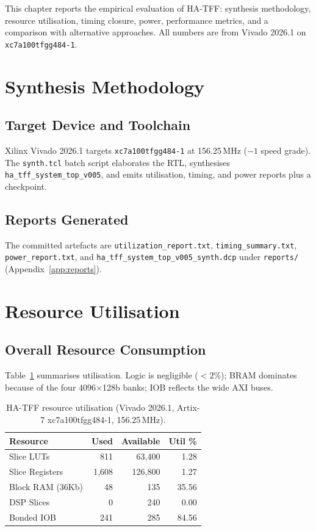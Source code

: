 \documentclass[12pt,twoside,openright]{book}
\begin{document}
This chapter reports the empirical evaluation of HA-TFF: synthesis methodology, resource
utilisation, timing closure, power, performance metrics, and a comparison with alternative
approaches. All numbers are from Vivado 2026.1 on \texttt{xc7a100tfgg484-1}.

\section{Synthesis Methodology}

\subsection{Target Device and Toolchain}

Xilinx Vivado 2026.1 targets \texttt{xc7a100tfgg484-1} at 156.25\,MHz ($-1$ speed grade). The
\texttt{synth.tcl} batch script elaborates the RTL, synthesises \texttt{ha\_tff\_system\_top\_v005},
and emits utilisation, timing, and power reports plus a checkpoint.

\subsection{Reports Generated}

The committed artefacts are \texttt{utilization\_report.txt}, \texttt{timing\_summary.txt},
\texttt{power\_report.txt}, and \texttt{ha\_tff\_system\_top\_v005\_synth.dcp} under
\texttt{reports/} (Appendix~\ref{app:reports}).

\section{Resource Utilisation}

\subsection{Overall Resource Consumption}

Table~\ref{tab:util} summarises utilisation. Logic is negligible ($<2$\%); BRAM dominates because of
the four 4096$\times$128b banks; IOB reflects the wide AXI buses.

\begin{table}[H]
\centering
\footnotesize
\begin{tabular}{lrrr}
\toprule
\textbf{Resource} & \textbf{Used} & \textbf{Available} & \textbf{Util \%} \\
\midrule
Slice LUTs & 811 & 63{,}400 & 1.28 \\
Slice Registers & 1{,}608 & 126{,}800 & 1.27 \\
Block RAM (36Kb) & 48 & 135 & 35.56 \\
DSP Slices & 0 & 240 & 0.00 \\
Bonded IOB & 241 & 285 & 84.56 \\
\bottomrule
\end{tabular}
\caption{HA-TFF resource utilisation (Vivado 2026.1, Artix-7 xc7a100tfgg484-1, 156.25\,MHz).}
\label{tab:util}
\end{table}
\end{document}
